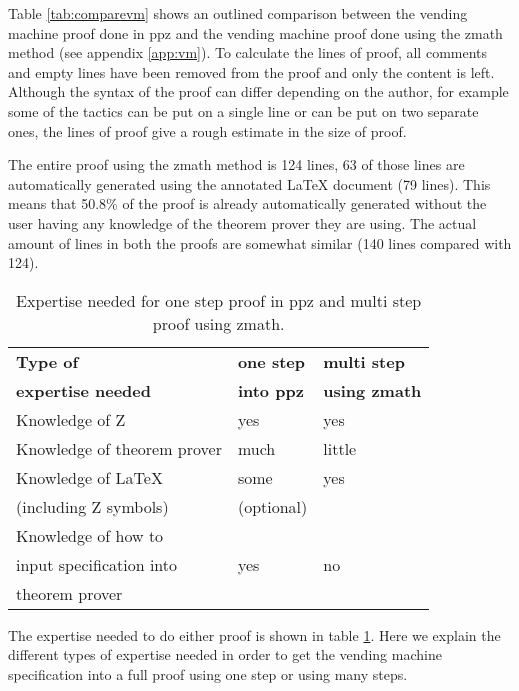 Table \ref{tab:comparevm} shows an outlined comparison between the vending
machine proof done in \gls{ppz} \cite{pp} and the vending machine proof done
using the \gls{zmath} method (see appendix \ref{app:vm}). To calculate the lines
of proof, all comments and empty lines have been removed from the proof and only
the content is left. Although the syntax of the proof can differ depending on
the author, for example some of the tactics can be put on a single line or can
be put on two separate ones, the lines of proof give a rough estimate in the
size of  proof.

The entire proof using the \gls{zmath} method is 124 lines, 63 of those lines
are automatically generated using the annotated \LaTeX{} document (79 lines).
This means that 50.8\% of the proof is already automatically generated without
the user having any knowledge of the theorem prover they are using. The actual
amount of lines in both the proofs are somewhat similar (140 lines compared with
124).

\begin{table}[H]
\begin{center}
\begin{tabular}{| l | l | l |}
\hline
\textbf{Type of} & \textbf{one step} & \textbf{multi step} \\
\textbf{expertise needed} & \textbf{into \gls{ppz}} & \textbf{using \gls{zmath}}
\\
\hline
\hline
Knowledge of Z &  yes & yes \\
\hline
Knowledge of theorem prover & much & little \\
\hline
Knowledge of \LaTeX & some & yes \\
(including Z symbols) & (optional) & \\
\hline
Knowledge of how to & & \\
input specification into & yes & no \\
theorem prover & & \\
\hline
\end{tabular}
\end{center}
\caption{Expertise needed for one step proof in \gls{ppz} and multi step proof using \gls{zmath}.}
\label{tab:expertise}
\end{table}

The expertise needed to do either proof is shown in table \ref{tab:expertise}.
Here we explain the different types of expertise needed in order to get the
vending machine specification into a full proof using one step or using many
steps.

